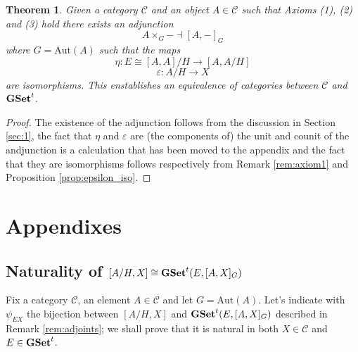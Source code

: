 \documentclass[italian, 12pt, reqno]{article}
\theoremstyle{myteo}
\newtheorem{theorem}{Theorem}[section]
\numberwithin{equation}{section}
\newcommand{\cat}[1]{\mathscr{#1}}
\newcommand{\aut}{\text{Aut}}
\newcommand{\tgset}{\text{\textbf{GSet}}^t}
\newcommand{\homs}[2]{[#1, #2]}
\newcommand{\fun}[3]{#1\colon#2\to #3}
\begin{document}
\begin{theorem}
  \label{theo:galois}
  Given a category \(\cat{C}\) and an object \(A\in\cat{C}\) such that Axioms (1), (2) and (3) hold there exists an adjunction
  \[A\times_G- \dashv \homs{A}{-}_G\]
  where \(G = \text{Aut}(A)\) such that the maps
  \[\fun{\eta}{E\cong \homs{A}{A}/H}{\homs{A}{A/H}}\]
  \[\fun{\varepsilon}{A/H}{X}\]
  are isomorphisms.
  This enstablishes an equivalence of categories between \(\cat{C}\) and \(\tgset\).
\end{theorem}

\begin{proof}
  The existence of the adjunction follows from the discussion in Section \ref{sec:1}, the fact that \(\eta\) and \(\varepsilon\) are (the components of) the unit and counit of the andjunction is a calculation that has been moved to the appendix and the fact that they are isomorphisms follows respectively from Remark \ref{rem:axiom1} and Proposition \ref{prop:epsilon_iso}.
\end{proof}

\section{Appendixes}
\label{sec:appendixes}

\subsection{Naturality of \(\homs{A/H}{X} \cong \tgset(E, \homs{A}{X}_G)\)}
Fix a category \(\cat{C}\), an element \(A\in\cat{C}\) and let \(G = \aut(A)\).
Let's indicate with \(\psi_{EX}\) the bijection between \(\homs{A/H}{X}\) and \(\tgset(E, \homs{A}{X}_G)\) described in Remark \ref{rem:adjoints}; we shall prove that it is natural in both \(X\in\cat{C}\) and \(E\in\tgset\).
\end{document}
